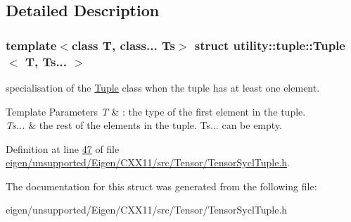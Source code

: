 \subsection{Detailed Description}
\subsubsection*{template$<$class T, class... Ts$>$\newline
struct utility\+::tuple\+::\+Tuple$<$ T, Ts... $>$}

specialisation of the \hyperlink{structutility_1_1tuple_1_1_tuple}{Tuple} class when the tuple has at least one element. 


\begin{DoxyTemplParams}{Template Parameters}
{\em T} & \+: the type of the first element in the tuple. \\
\hline
{\em Ts...} & the rest of the elements in the tuple. Ts... can be empty. \\
\hline
\end{DoxyTemplParams}


Definition at line \hyperlink{eigen_2unsupported_2_eigen_2_c_x_x11_2src_2_tensor_2_tensor_sycl_tuple_8h_source_l00047}{47} of file \hyperlink{eigen_2unsupported_2_eigen_2_c_x_x11_2src_2_tensor_2_tensor_sycl_tuple_8h_source}{eigen/unsupported/\+Eigen/\+C\+X\+X11/src/\+Tensor/\+Tensor\+Sycl\+Tuple.\+h}.



The documentation for this struct was generated from the following file\+:\begin{DoxyCompactItemize}
\item 
eigen/unsupported/\+Eigen/\+C\+X\+X11/src/\+Tensor/\+Tensor\+Sycl\+Tuple.\+h\end{DoxyCompactItemize}
